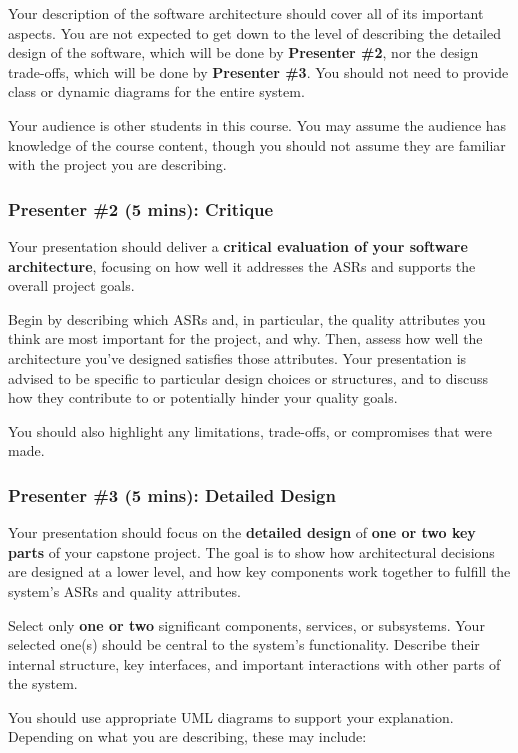 \documentclass{csse4400}
\begin{document}
Your description of the software architecture should cover all of its important aspects.
You are not expected to get down to the level of describing the detailed design of the software, which will be done by \textbf{Presenter \#2}, nor the design trade-offs, which will be done by \textbf{Presenter \#3}.
You should not need to provide class or dynamic diagrams for the entire system.

Your audience is other students in this course. You may assume the audience has knowledge of the course content,
though you should not assume they are familiar with the project you are describing.


\subsubsection{Presenter \#2 (5 mins): Critique}


Your presentation should deliver a \textbf{critical evaluation of your software architecture}, focusing on how well it addresses the ASRs and supports the overall project goals.

Begin by describing which ASRs and, in particular, the quality attributes you think are most important for the project, and why.
Then, assess how well the architecture you've designed satisfies those attributes.
Your presentation is advised to be specific to particular design choices or structures, and to discuss how they contribute to or potentially hinder your quality goals.

You should also highlight any limitations, trade-offs, or compromises that were made.


\subsubsection{Presenter \#3 (5 mins): Detailed Design}

Your presentation should focus on the \textbf{detailed design} of \textbf{one or two key parts} of your capstone project. The goal is to show how architectural decisions are designed at a lower level, and how key components work together to fulfill the system's ASRs and quality attributes.

Select only \textbf{one or two} significant components, services, or subsystems. Your selected one(s) should be central to the system's functionality. Describe their internal structure, key interfaces, and important interactions with other parts of the system.

You should use appropriate UML diagrams to support your explanation. Depending on what you are describing, these may include:
\end{document}

